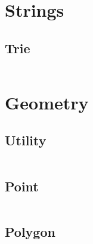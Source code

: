 \section{Strings}
  \subsection{Trie}
    \inputminted{cpp}{library/strings/trie.hpp}

\section{Geometry}
  \subsection{Utility}
    \inputminted{cpp}{library/geo/geoutil.hpp}
  \subsection{Point}
    \inputminted{cpp}{library/geo/point.hpp}
  \subsection{Polygon}
    \inputminted{cpp}{library/geo/polygon.hpp}